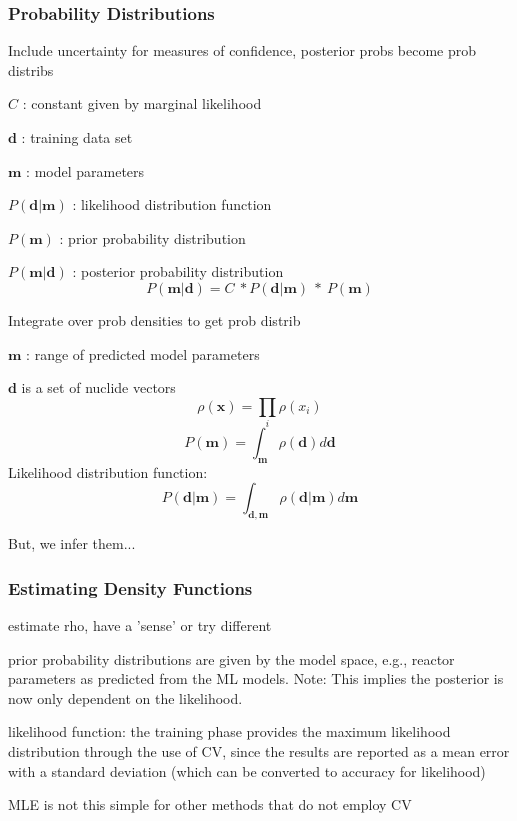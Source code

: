 
\begin{frame}
  \frametitle{Probability Distributions}
  \footnotesize 
  Include uncertainty for measures of confidence, posterior probs become prob distribs

  $C$ : constant given by marginal likelihood
  
  $\boldsymbol{d}$ : training data set
  
  $\boldsymbol{m}$ : model parameters
  
  $P(\boldsymbol{d}|\boldsymbol{m})$ : likelihood distribution function
  
  $P(\boldsymbol{m})$ : prior probability distribution
  
  $P(\boldsymbol{m}|\boldsymbol{d})$ : posterior probability distribution
  $$ P(\boldsymbol{m}|\boldsymbol{d}) = C\ * P(\boldsymbol{d}|\boldsymbol{m})\ *\ P(\boldsymbol{m}) $$
 
  Integrate over prob densities to get prob distrib
  
  $\boldsymbol{m}$ : range of predicted model parameters
  
  $\boldsymbol{d}$ is a set of nuclide vectors
  $$\rho(\boldsymbol{x}) = \prod_{i} \rho(x_i)$$
  $$ P(\boldsymbol{m}) = \int_{\boldsymbol{m}} \rho(\boldsymbol{d}) d\boldsymbol{d} $$
  Likelihood distribution function:
  $$ P(\boldsymbol{d}|\boldsymbol{m}) = \int_{\boldsymbol{d}, \boldsymbol{m}} \rho(\boldsymbol{d}|\boldsymbol{m}) d\boldsymbol{m} $$

  But, we infer them...
  \normalsize
\end{frame}

\begin{frame}
  \frametitle{Estimating Density Functions}
  estimate rho, have a 'sense' or try different 

  prior probability distributions are given by the model space, e.g., reactor
  parameters as predicted from the ML models. \cite{bayes_compare} 
  Note: This implies the posterior is now only dependent on the likelihood.

  likelihood function: the training phase provides the maximum likelihood
  distribution through the use of CV, since the results are reported as a
  mean error with a standard deviation (which can be converted to accuracy for
  likelihood) \cite{scikit}

  MLE is not this simple for other methods that do not employ CV \cite{gentle_bayes, bayes_compare}
\end{frame}

